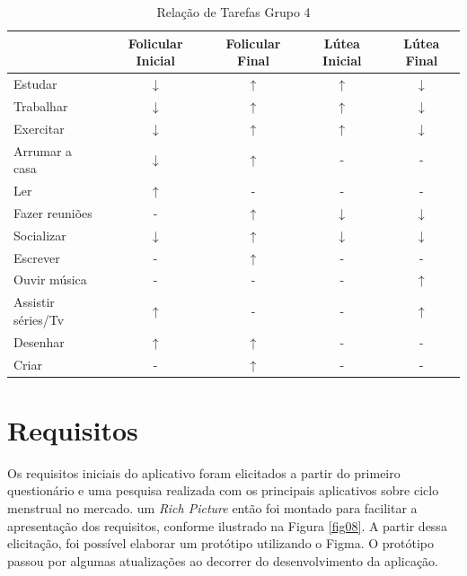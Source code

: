 \begin{table}[]
    \centering
    \caption{Relação de Tarefas Grupo 4}
    \label{tab14}
    \begin{tabular}{|l|c|c|c|c|}
    \hline
    \rowcolor[HTML]{C0C0C0} 
    \multicolumn{1}{|c|}{\cellcolor[HTML]{C0C0C0}Tarefas recomendadas}  & Folicular Inicial & Folicular Final  & Lútea Inicial& Lútea Final \\ \hline
    Estudar & $\downarrow$  & $\uparrow$ & $\uparrow$ & $\downarrow$ \\ \hline
    \rowcolor[HTML]{EFEFEF} 
    Trabalhar & $\downarrow$ & $\uparrow$  & $\uparrow$ &  $\downarrow$  \\ \hline
    Exercitar & $\downarrow$ & $\uparrow$ & $\uparrow$ &  $\downarrow$  \\ \hline
    \rowcolor[HTML]{EFEFEF} 
    Arrumar a casa  & $\downarrow$ & $\uparrow$  & - & - \\ \hline
    Ler & $\uparrow$ & -  & - & - \\ \hline
    \rowcolor[HTML]{EFEFEF} 
    Fazer reuniões & - & $\uparrow$ & $\downarrow$ & $\downarrow$ \\ \hline
    \rowcolor[HTML]{EFEFEF} 
    Socializar & $\downarrow$ & $\uparrow$  & $\downarrow$ & $\downarrow$ \\ \hline
    \rowcolor[HTML]{EFEFEF} 
    Escrever & - & $\uparrow$  & - & - \\ \hline
    Ouvir música & - & - & - & $\uparrow$ \\ \hline
    \rowcolor[HTML]{EFEFEF} 
    Assistir séries/Tv & $\uparrow$ & - & - & $\uparrow$ \\ \hline
    Desenhar & $\uparrow$ & $\uparrow$  & - & - \\ \hline
    \rowcolor[HTML]{EFEFEF} 
    Criar & - & $\uparrow$  & - & - \\ \hline
    \end{tabular}
    \end{table}

\section{Requisitos}

Os requisitos iniciais do aplicativo foram elicitados a partir do primeiro questionário e uma pesquisa realizada 
com os principais aplicativos sobre ciclo menstrual no mercado.  
um \emph{Rich Picture} então foi montado para facilitar a apresentação dos requisitos, conforme ilustrado na Figura \ref{fig08}.
A partir dessa elicitação, foi possível elaborar um protótipo utilizando o Figma. O protótipo passou por 
algumas atualizações ao decorrer do desenvolvimento da aplicação.

